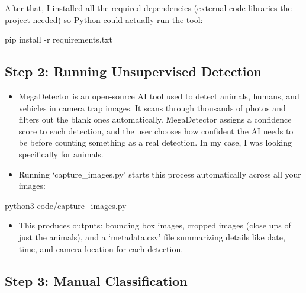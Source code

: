 \documentclass[
  letterpaper,
  DIV=11,
  numbers=noendperiod]{scrartcl}
\newenvironment{Shaded}{\begin{snugshade}}{\end{snugshade}}
\newcommand{\AttributeTok}[1]{\textcolor[rgb]{0.40,0.45,0.13}{#1}}
\newcommand{\ExtensionTok}[1]{\textcolor[rgb]{0.00,0.23,0.31}{#1}}
\newcommand{\NormalTok}[1]{\textcolor[rgb]{0.00,0.23,0.31}{#1}}
\providecommand{\tightlist}{%
  \setlength{\itemsep}{0pt}\setlength{\parskip}{0pt}}
\begin{document}
After that, I installed all the required dependencies (external code
libraries the project needed) so Python could actually run the tool:

\begin{Shaded}
\begin{Highlighting}[]
\ExtensionTok{pip}\NormalTok{ install }\AttributeTok{{-}r}\NormalTok{ requirements.txt}
\end{Highlighting}
\end{Shaded}

\subsection{Step 2: Running Unsupervised
Detection}\label{step-2-running-unsupervised-detection}

\begin{itemize}
\tightlist
\item
  MegaDetector is an open-source AI tool used to detect animals, humans,
  and vehicles in camera trap images. It scans through thousands of
  photos and filters out the blank ones automatically. MegaDetector
  assigns a confidence score to each detection, and the user chooses how
  confident the AI needs to be before counting something as a real
  detection. In my case, I was looking specifically for animals.
\item
  Running `capture\_images.py' starts this process automatically across
  all your images:
\end{itemize}

\begin{Shaded}
\begin{Highlighting}[]
\ExtensionTok{python3}\NormalTok{ code/capture\_images.py}
\end{Highlighting}
\end{Shaded}

\begin{itemize}
\tightlist
\item
  This produces outputs: bounding box images, cropped images (close ups
  of just the animals), and a `metadata.csv' file summarizing details
  like date, time, and camera location for each detection.
\end{itemize}

\subsection{Step 3: Manual
Classification}\label{step-3-manual-classification}
\end{document}
